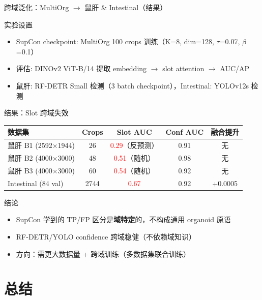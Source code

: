 \documentclass[aspectratio=169, 10pt]{beamer}
\begin{document}
\begin{frame}{跨域泛化：MultiOrg $\to$ 鼠肝 \& Intestinal（结果）}
  \begin{block}{实验设置}
    \begin{itemize}
      \item SupCon checkpoint: MultiOrg 100 crops 训练（K=8, dim=128, $\tau$=0.07, $\beta$=0.1）
      \item 评估: DINOv2 ViT-B/14 提取 embedding $\to$ slot attention $\to$ AUC/AP
      \item 鼠肝: RF-DETR Small 检测（3 batch checkpoint），Intestinal: YOLOv12s 检测
    \end{itemize}
  \end{block}
  \vspace{0em}
  \begin{alertblock}{结果：Slot 跨域失效}
    \footnotesize
    \begin{tabular}{lcccc}
      \toprule
      \textbf{数据集} & \textbf{Crops} & \textbf{Slot AUC} & \textbf{Conf AUC} & \textbf{融合提升} \\
      \midrule
      鼠肝 B1 (2592$\times$1944) & 26 & \textcolor{red}{0.29}（反预测） & 0.91 & 无 \\
      鼠肝 B2 (4000$\times$3000) & 48 & \textcolor{red}{0.51}（随机） & 0.98 & 无 \\
      鼠肝 B3 (4000$\times$3000) & 60 & \textcolor{red}{0.54}（随机） & 0.92 & 无 \\
      Intestinal (84 val) & 2744 & \textcolor{red}{0.67} & 0.92 & +0.0005 \\
      \bottomrule
    \end{tabular}
  \end{alertblock}
  \vspace{0em}
  \begin{block}{结论}
    \begin{itemize}
      \item SupCon 学到的 TP/FP 区分是\textbf{域特定}的，不构成通用 organoid 原语
      \item RF-DETR/YOLO confidence 跨域稳健（不依赖域知识）
      \item 方向：需更大数据量 + 跨域训练（多数据集联合训练）
    \end{itemize}
  \end{block}
\end{frame}


\section{总结}
\end{document}
